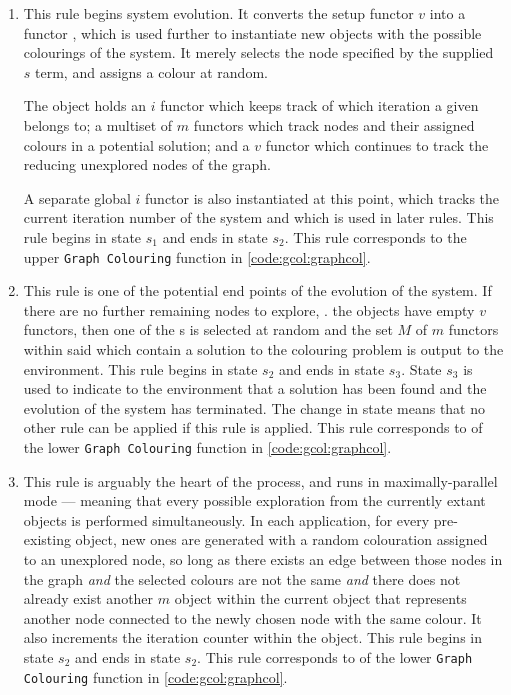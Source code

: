 \begin{enumerate}
\item This rule begins system evolution.  It converts the setup functor \(v\) into a functor \bo{}, which is used further to instantiate new objects with the possible colourings of the system.  It merely selects the node specified by the supplied \(s\) term, and assigns a colour at random.

The \bo{} object holds an \(i\) functor which keeps track of which iteration a given \bo{} belongs to; a multiset of \(m\) functors which track nodes and their assigned colours in a potential solution; and a \(v\) functor which continues to track the reducing unexplored nodes of the graph.

A separate global \(i\) functor is also instantiated at this point, which tracks the current iteration number of the system and which is used in later rules.  This rule begins in state \(s_1\) and ends in state \(s_2\).  This rule corresponds to the upper \texttt{Graph Colouring} function in \cref{code:gcol:graphcol}.

\item This rule is one of the potential end points of the evolution of the system.  If there are no further remaining nodes to explore, \ie{}. the \bo{} objects have empty \(v\) functors, then one of the \bo{}s is selected at random and the set \(M\) of \(m\) functors within said \bo{} which contain a solution to the colouring problem is output to the environment.  This rule begins in state \(s_2\) and ends in state \(s_3\).  State \(s_3\) is used to indicate to the environment that a solution has been found and the evolution of the system has terminated.  The change in state means that no other rule can be applied if this rule is applied.  This rule corresponds to  of the lower \texttt{Graph Colouring} function in \cref{code:gcol:graphcol}.

\item This rule is arguably the heart of the process, and runs in maximally-parallel mode --- meaning that every possible exploration from the currently extant \bo{} objects is performed simultaneously.  In each application, for every pre-existing \bo{} object, new ones are generated with a random colouration assigned to an unexplored node, so long as there exists an edge between those nodes in the graph \emph{and} the selected colours are not the same \emph{and} there does not already exist another \(m\) object within the current \bo{} object that represents another node connected to the newly chosen node with the same colour.  It also increments the iteration counter within the \bo{} object.  This rule begins in state \(s_2\) and ends in state \(s_2\).  This rule corresponds to  of the lower \texttt{Graph Colouring} function in \cref{code:gcol:graphcol}.


\end{enumerate}
